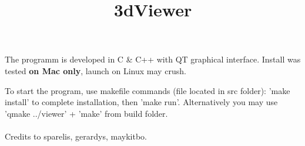 \documentclass[a4paper]{article}
\begin{document}
\title{{\bf 3dViewer}}
\maketitle

The programm is developed in C \& C++ with QT graphical interface. Install was tested {\bf on Mac only}, launch on Linux may crush. 
\\
\par
To start the program, use makefile commands (file located in src folder): 'make install' to complete installation, then 'make run'. Alternatively you may use 'qmake ../viewer' + 'make' from build folder.
\\
\\
Credits to sparelis, gerardys, maykitbo.
\end{document}
